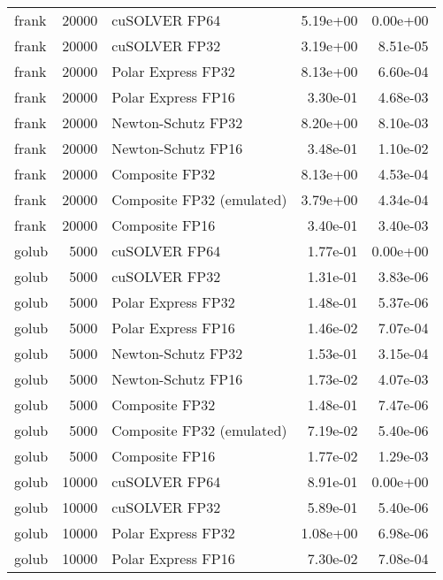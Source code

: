 \begin{table}
\begin{tabular}{lrlrr}
    frank & 20000 &             cuSOLVER FP64 &  5.19e+00 &        0.00e+00 \\
    frank & 20000 &             cuSOLVER FP32 &  3.19e+00 &        8.51e-05 \\
    frank & 20000 &        Polar Express FP32 &  8.13e+00 &        6.60e-04 \\
    frank & 20000 &        Polar Express FP16 &  3.30e-01 &        4.68e-03 \\
    frank & 20000 &        Newton-Schutz FP32 &  8.20e+00 &        8.10e-03 \\
    frank & 20000 &        Newton-Schutz FP16 &  3.48e-01 &        1.10e-02 \\
    frank & 20000 &            Composite FP32 &  8.13e+00 &        4.53e-04 \\
    frank & 20000 & Composite FP32 (emulated) &  3.79e+00 &        4.34e-04 \\
    frank & 20000 &            Composite FP16 &  3.40e-01 &        3.40e-03 \\
    golub &  5000 &             cuSOLVER FP64 &  1.77e-01 &        0.00e+00 \\
    golub &  5000 &             cuSOLVER FP32 &  1.31e-01 &        3.83e-06 \\
    golub &  5000 &        Polar Express FP32 &  1.48e-01 &        5.37e-06 \\
    golub &  5000 &        Polar Express FP16 &  1.46e-02 &        7.07e-04 \\
    golub &  5000 &        Newton-Schutz FP32 &  1.53e-01 &        3.15e-04 \\
    golub &  5000 &        Newton-Schutz FP16 &  1.73e-02 &        4.07e-03 \\
    golub &  5000 &            Composite FP32 &  1.48e-01 &        7.47e-06 \\
    golub &  5000 & Composite FP32 (emulated) &  7.19e-02 &        5.40e-06 \\
    golub &  5000 &            Composite FP16 &  1.77e-02 &        1.29e-03 \\
    golub & 10000 &             cuSOLVER FP64 &  8.91e-01 &        0.00e+00 \\
    golub & 10000 &             cuSOLVER FP32 &  5.89e-01 &        5.40e-06 \\
    golub & 10000 &        Polar Express FP32 &  1.08e+00 &        6.98e-06 \\
    golub & 10000 &        Polar Express FP16 &  7.30e-02 &        7.08e-04 \\

\end{tabular}
\end{table}
